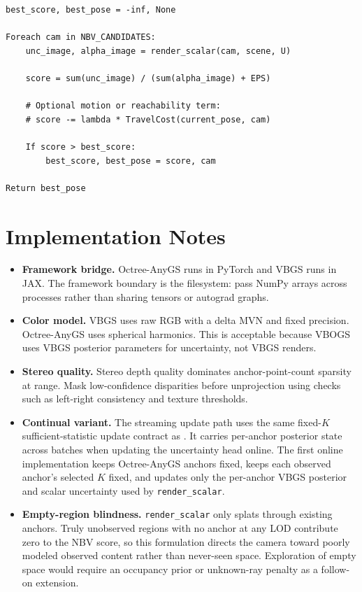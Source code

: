 \documentclass[11pt]{article}
\begin{document}
\begin{lstlisting}
best_score, best_pose = -inf, None

Foreach cam in NBV_CANDIDATES:
    unc_image, alpha_image = render_scalar(cam, scene, U)

    score = sum(unc_image) / (sum(alpha_image) + EPS)

    # Optional motion or reachability term:
    # score -= lambda * TravelCost(current_pose, cam)

    If score > best_score:
        best_score, best_pose = score, cam

Return best_pose
\end{lstlisting}

\section{Implementation Notes}

\begin{itemize}
  \item \textbf{Framework bridge.} Octree-AnyGS runs in PyTorch and VBGS runs
        in JAX. The framework boundary is the filesystem: pass NumPy arrays
        across processes rather than sharing tensors or autograd graphs.
  \item \textbf{Color model.} VBGS uses raw RGB with a delta MVN and fixed
        precision. Octree-AnyGS uses spherical harmonics. This is acceptable
        because VBOGS uses VBGS posterior parameters for uncertainty, not VBGS
        renders.
  \item \textbf{Stereo quality.} Stereo depth quality dominates
        anchor-point-count sparsity at range. Mask low-confidence disparities
        before unprojection using checks such as left-right consistency and
        texture thresholds.
  \item \textbf{Continual variant.} The streaming update path uses the same
        fixed-\(K\) sufficient-statistic update contract as
        . It carries per-anchor posterior state across
        batches when updating the uncertainty head online. The first online
        implementation keeps Octree-AnyGS anchors fixed, keeps each observed
        anchor's selected \(K\) fixed, and updates only the per-anchor VBGS
        posterior and scalar uncertainty used by \texttt{render\_scalar}.
  \item \textbf{Empty-region blindness.} \texttt{render\_scalar} only splats
        through existing anchors. Truly unobserved regions with no anchor at
        any LOD contribute zero to the NBV score, so this formulation directs
        the camera toward poorly modeled observed content rather than never-seen
        space. Exploration of empty space would require an occupancy prior or
        unknown-ray penalty as a follow-on extension.
\end{itemize}
\end{document}
